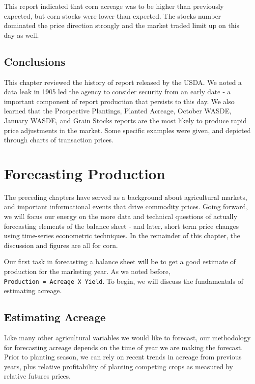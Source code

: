 \documentclass[]{book}
\theoremstyle{definition}
\theoremstyle{definition}
\theoremstyle{remark}
\begin{document}
This report indicated that corn acreage was to be higher than previously
expected, but corn stocks were lower than expected. The stocks number
dominated the price direction strongly and the market traded limit up on
this day as well.

\section{Conclusions}\label{conclusions}

This chapter reviewed the history of report released by the USDA. We
noted a data leak in 1905 led the agency to consider security from an
early date - a important component of report production that persists to
this day. We also learned that the Prospective Plantings, Planted
Acreage, October WASDE, January WASDE, and Grain Stocks reports are the
most likely to produce rapid price adjustments in the market. Some
specific examples were given, and depicted through charts of transaction
prices.

\chapter{Forecasting Production}\label{forecasting-production}

The preceding chapters have served as a background about agricultural
markets, and important informational events that drive commodity prices.
Going forward, we will focus our energy on the more data and technical
questions of actually forecasting elements of the balance sheet - and
later, short term price changes using time-series econometric
techniques. In the remainder of this chapter, the discussion and figures
are all for corn.

Our first task in forecasting a balance sheet will be to get a good
estimate of production for the marketing year. As we noted before,
\texttt{Production\ =\ Acreage\ X\ Yield}. To begin, we will discuss the
fundamentals of estimating acreage.

\section{Estimating Acreage}\label{estimating-acreage}

Like many other agricultural variables we would like to forecast, our
methodology for forecasting acreage depends on the time of year we are
making the forecast. Prior to planting season, we can rely on recent
trends in acreage from previous years, plus relative profitability of
planting competing crops as measured by relative futures prices.
\end{document}
